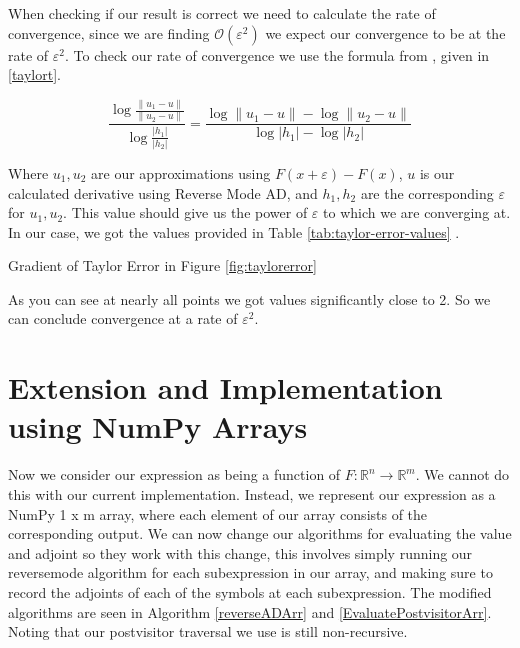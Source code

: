 \documentclass{article}
\begin{document}
When checking if our result is correct we need to calculate the rate of convergence, since we are finding $\mathcal{O}(\varepsilon^2)$ we expect our convergence to be at the rate of $\varepsilon^2$. To check our rate of convergence we use the formula from \cite{finite}, given in \eqref{taylort}.

\begin{equation} \label{taylort}
   \frac{\log{\frac{\|u_1 - u\|}{\|u_2 - u\|}}}{\log{\frac{|h_1|}{|h_2|}}} = \frac{\log\|u_1 - u\| - \log\|u_2 - u\|}{\log|h_1| - \log|h_2|}
\end{equation}

Where $u_1, u_2$ are our approximations using $F(x + \varepsilon) - F(x)$, $u$ is our calculated derivative using Reverse Mode AD, and $h_1, h_2$ are the corresponding $\varepsilon$ for $u_1, u_2$. This value should give us the power of $\varepsilon$ to which we are converging at. In our case, we got the values provided in Table \ref{tab:taylor-error-values} \cite{github}.

\begin{table}[h]
    \begin{center}
    \end{center}
    \caption{Gradient of Taylor Error in Figure \ref{fig:taylorerror}}
    \label{tab:taylor-error-values}
\end{table}


As you can see at nearly all points we got values significantly close to 2. So we can conclude convergence at a rate of $\varepsilon^2$.


\section{Extension and Implementation using NumPy Arrays}

Now we consider our expression as being a function of $F: \mathbb{R}^n \longrightarrow \mathbb{R}^m$. We cannot do this with our current implementation. Instead, we represent our expression as a NumPy 1 x m array, where each element of our array consists of the corresponding output. We can now change our algorithms for evaluating the value and adjoint so they work with this change, this involves simply running our reversemode algorithm for each subexpression in our array, and making sure to record the adjoints of each of the symbols at each subexpression. The modified algorithms are seen in Algorithm \ref{reverseADArr} and \ref{EvaluatePostvisitorArr}. Noting that our postvisitor traversal we use is still non-recursive.
\end{document}
